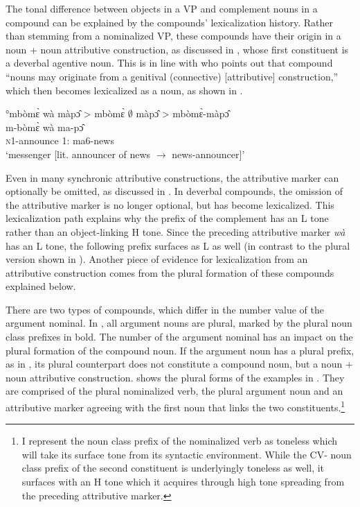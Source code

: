The tonal difference between objects in a VP and complement nouns in a compound can be explained by the compounds' lexicalization history. Rather than stemming from a nominalized VP, these compounds have their origin in a noun + noun attributive construction, as discussed in , whose first constituent is a deverbal agentive noun. This is in line with \citet[87]{schadeberg2003} who points out that compound ``nouns may originate from a genitival (connective) [attributive] construction,'' which then becomes lexicalized as a noun, as shown in .

\ea \label{CompoundVN}
\glll   °mbòmɛ̀ wà màpɔ̂  > mbòmɛ̀ $\emptyset$ màpɔ̂  >  mbòmɛ̀-màpɔ̂  \\
m-bòmɛ̀ wà ma-pɔ̂ \\
	\textsc{n}1-announce 1:{\ATT} ma6-news \\
\glt `messenger [lit. announcer of news $\rightarrow$ news-announcer]'
\z

\noindent Even in many synchronic attributive constructions, the attributive marker can optionally be omitted, as discussed in . In deverbal compounds, the omission of the attributive marker is no longer optional, but has become lexicalized. This lexicalization path explains why the prefix of the complement has an L tone rather than an object-linking H tone. Since the preceding attributive marker {\itshape wà} has an L tone, the following prefix surfaces as L as well (in contrast to the plural version shown in ).   Another piece of evidence for lexicalization from an attributive construction comes from the plural formation of these compounds explained below.


There are two types of  compounds, which differ in the number value of the argument nominal. In , all argument nouns are plural, marked by the plural noun class prefixes in bold.
The number of the argument nominal has an impact on the plural formation of the compound noun. If the argument noun has a plural prefix, as in , its plural counterpart does not constitute a compound noun, but a noun + noun attributive construction.  shows the plural forms of the examples in . They are comprised of the plural nominalized verb, the plural argument noun and an attributive marker agreeing with the first noun that links the two constituents.\footnote{I represent the noun class prefix of the nominalized verb as toneless which will take its surface tone from its syntactic environment. While the CV- noun class prefix of the second constituent is underlyingly toneless as well, it surfaces with an H tone which it acquires through high tone spreading from the preceding attributive marker.}

